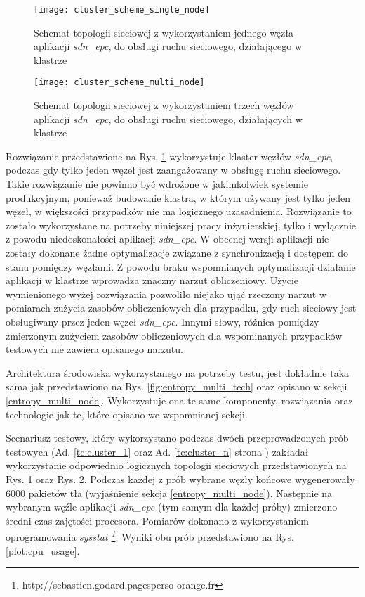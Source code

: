\begin{figure}[h]
\centering
\texttt{[image: cluster\_scheme\_single\_node]}
\caption{Schemat topologii sieciowej z wykorzystaniem jednego węzła aplikacji
   \textit{sdn\_epc}, do obsługi ruchu sieciowego, działającego w klastrze}
\label{fig:cluster_scheme_single_node}
\end{figure}
\newpage

\begin{figure}[h]
\centering
\texttt{[image: cluster\_scheme\_multi\_node]}
\caption{Schemat topologii sieciowej z wykorzystaniem trzech węzłów aplikacji
  \textit{sdn\_epc}, do obsługi ruchu sieciowego, działających w klastrze}
\label{fig:cluster_scheme_multi_node}
\end{figure}

Rozwiązanie przedstawione na Rys. \ref{fig:cluster_scheme_single_node}
wykorzystuje klaster węzłów \textit{sdn\_epc}, podczas gdy tylko jeden węzeł
jest zaangażowany w obsługę ruchu sieciowego. Takie rozwiązanie nie powinno być
wdrożone w jakimkolwiek systemie produkcyjnym, ponieważ budowanie klastra, w
którym używany jest tylko jeden węzeł, w większości przypadków nie ma logicznego
uzasadnienia. Rozwiązanie to zostało wykorzystane na potrzeby niniejszej pracy
inżynierskiej, tylko i wyłącznie z powodu niedoskonałości aplikacji
\textit{sdn\_epc}. W obecnej wersji aplikacji nie zostały dokonane żadne
optymalizacje związane z synchronizacją i dostępem do stanu pomiędzy węzłami. Z
powodu braku wspomnianych optymalizacji działanie aplikacji w klastrze wprowadza
znaczny narzut obliczeniowy. Użycie wymienionego wyżej rozwiązania pozwoliło
niejako ująć rzeczony narzut w pomiarach zużycia zasobów obliczeniowych dla
przypadku, gdy ruch sieciowy jest obsługiwany przez jeden węzeł
\textit{sdn\_epc}. Innymi słowy, różnica pomiędzy zmierzonym zużyciem zasobów
obliczeniowych dla wspominanych przypadków testowych nie zawiera opisanego
narzutu. 

Architektura środowiska wykorzystanego na potrzeby testu, jest dokładnie taka
sama jak przedstawiono na Rys. \ref{fig:entropy_multi_tech} oraz opisano w
sekcji \ref{entropy_multi_node}. Wykorzystuje ona te same komponenty,
rozwiązania oraz technologie jak te, które opisano we wspomnianej sekcji.

Scenariusz testowy, który wykorzystano podczas dwóch przeprowadzonych prób
testowych (Ad. \ref{tc:cluster_1} oraz Ad. \ref{tc:cluster_n} strona
\pageref{tc:cluster_1}) zakładał wykorzystanie odpowiednio logicznych topologii
sieciowych przedstawionych na Rys. \ref{fig:cluster_scheme_single_node} oraz
Rys. \ref{fig:cluster_scheme_multi_node}. Podczas każdej z prób wybrane węzły
końcowe wygenerowały 6000 pakietów tła (wyjaśnienie sekcja
\ref{entropy_multi_node}). Następnie na wybranym węźle aplikacji
\textit{sdn\_epc} (tym samym dla każdej próby) zmierzono średni czas zajętości 
procesora. Pomiarów dokonano z wykorzystaniem oprogramowania \textit{sysstat
  \footnote{http://sebastien.godard.pagesperso-orange.fr}}. Wyniki obu prób
przedstawiono na Rys. \ref{plot:cpu_usage}.

